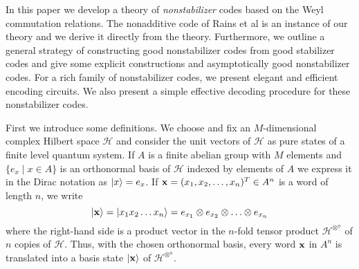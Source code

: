 \documentclass{Rinton-P9x6}
\newcommand {\ket} [1] {\ensuremath \left\vert#1\ensuremath \right\rangle}
\renewcommand{\bold}[1]{{\bf #1}}
\newcommand{\x}{{\bf x}}
\newcommand{\Hi}{{\ensuremath{\mathcal{H}}}}
\begin{document}
In this paper we develop a theory of \emph{nonstabilizer} codes based
on the Weyl commutation relations. The nonadditive code of Rains et
al\cite{rains97nonadditive} is an instance of our theory and we derive
it directly from the theory. Furthermore, we outline a general
strategy of constructing good nonstabilizer codes from good stabilizer
codes and give some explicit constructions and asymptotically good
nonstabilizer codes. For a rich family of nonstabilizer codes, we
present elegant and efficient encoding circuits. We also present a
simple effective decoding procedure for these nonstabilizer codes.

First we introduce some definitions. We choose and fix an
$M$-dimensional complex Hilbert space $\Hi$ and consider the unit
vectors of $\Hi$ as pure states of a finite level quantum system. If
$A$ is a finite abelian group with $M$ elements and $\{e_x\mid x\in
A\}$ is an orthonormal basis of $\Hi$ indexed by elements of $A$ we
express it in the Dirac notation as $\ket{x}=e_x$.  If
$\bold{x}=(x_1,x_2,\ldots,x_n)^T\in A^n$ is a word of length $n$, we
write
\[
\ket{\x}=\ket{x_1x_2\ldots x_n}=e_{x_1}\otimes e_{x_2}\otimes\ldots\otimes e_{x_n}
\]
where the right-hand side is a product vector in the $n$-fold tensor
product $\Hi^{\otimes^n}$ of $n$ copies of $\Hi$. Thus, with the
chosen orthonormal basis, every word $\x$ in $A^n$ is translated into
a basis state $\ket{\x}$ of $\Hi^{\otimes^n}$.
\end{document}
